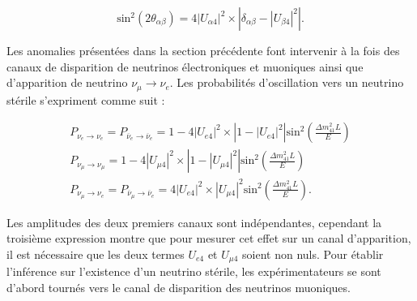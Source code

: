\begin{equation}
\textrm{sin}^2\left(2\theta_{\alpha\beta}\right) = 4 \left|U_{\alpha 4} \right|^2 \times \left|\delta_{\alpha\beta} - \left|U_{\beta 4}\right|^2\right|.
\end{equation}

\bigbreak

Les anomalies présentées dans la section précédente font intervenir à la fois des canaux de disparition de neutrinos électroniques et muoniques ainsi que d'apparition de neutrino $\nu_\mu \rightarrow \nu_e$. Les probabilités d'oscillation vers un neutrino stérile s'expriment comme suit :

\begin{equation}
\begin{gathered}
    P_{\nu_e \rightarrow \nu_e} = P_{\overline{\nu}_e \rightarrow \overline{\nu}_e} = 1 - 4 \left|U_{e4} \right|^2 \times \left|1 - \left|U_{e4}\right|^2\right| \textrm{sin}^2\left(\frac{\Delta m^2_{41}L}{E}  \right)\\
    P_{\nu_\mu \rightarrow \nu_\mu} = 1 - 4 \left|U_{\mu 4} \right|^2 \times \left|1 - \left|U_{\mu 4}\right|^2\right| \textrm{sin}^2\left(\frac{\Delta m^2_{41}L}{E}  \right)\\
    P_{\nu_\mu \rightarrow \nu_e} = P_{\overline{\nu}_\mu \rightarrow \overline{\nu}_e} = 4 \left|U_{e4} \right|^2 \times \left|U_{\mu 4}\right|^2 \textrm{sin}^2\left(\frac{\Delta m^2_{41}L}{E}  \right).
\end{gathered}
\end{equation}

\bigbreak

Les amplitudes des deux premiers canaux sont indépendantes, cependant la troisième expression montre que pour mesurer cet effet sur un canal d'apparition, il est nécessaire que les deux termes $U_{e4}$ et $U_{\mu 4}$ soient non nuls.  Pour établir l'inférence sur l'existence d'un neutrino stérile, les expérimentateurs se sont d'abord tournés vers le canal de disparition des neutrinos muoniques.\\

